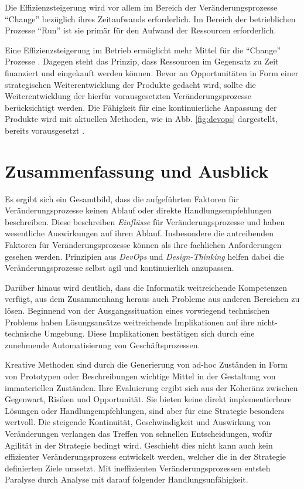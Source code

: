 \begin{enumerate}
    Die Effizienzsteigerung wird vor allem im Bereich der Veränderungsprozesse \enquote{Change} bezüglich ihres Zeitaufwands erforderlich. Im Bereich der betrieblichen Prozesse \enquote{Run} ist sie primär für den Aufwand der Ressourcen erforderlich.
    
    Eine Effizienzsteigerung im Betrieb ermöglicht mehr Mittel für die \enquote{Change} Prozesse \cite{Rausch2006}. Dagegen steht das Prinzip, dass Ressourcen im Gegensatz zu Zeit finanziert und eingekauft werden können. Bevor an Opportunitäten in Form einer strategischen Weiterentwicklung der Produkte \cite{Rausch2006} gedacht wird, sollte die Weiterentwicklung der hierfür vorausgesetzten Veränderungsprozesse berücksichtigt werden. Die Fähigkeit für eine kontinuierliche Anpassung \cite{Bussmann2006, Ganswindt2006} der Produkte wird mit aktuellen Methoden, wie in Abb. \ref{fig:devops} dargestellt, bereits vorausgesetzt \cite{Alt2017}.

\end{enumerate}

\section{Zusammenfassung und Ausblick}
Es ergibt sich ein Gesamtbild, dass die aufgeführten Faktoren für Veränderungsprozesse keinen Ablauf oder direkte Handlungsempfehlungen beschreiben. Diese beschreiben \emph{Einflüsse} für Veränderungsprozesse und haben wesentliche Auswirkungen auf ihren Ablauf. Insbesondere die antreibenden Faktoren für Veränderungsprozesse können als ihre fachlichen Anforderungen gesehen werden. Prinzipien aus \emph{DevOps} und \emph{Design-Thinking} helfen dabei die Veränderungsprozesse selbst agil und kontinuierlich anzupassen. 

Darüber hinaus wird deutlich, dass die Informatik weitreichende Kompetenzen verfügt, aus dem Zusammenhang heraus auch Probleme aus anderen Bereichen zu lösen. Beginnend von der Ausgangssituation eines vorwiegend technischen Problems haben Lösungsansätze weitreichende Implikationen auf ihre nicht-technische Umgebung. Diese Implikationen bestätigen sich durch eine zunehmende Automatisierung von Geschäftsprozessen.

Kreative Methoden sind durch die Generierung von ad-hoc Zuständen in Form von Prototypen oder Beschreibungen wichtige Mittel in der Gestaltung von immateriellen Zuständen. Ihre Evaluierung ergibt sich aus der Koheränz zwischen Gegenwart, Risiken und Opportunität. Sie bieten keine direkt implementierbare Lösungen oder Handlungempfehlungen, sind aber für eine Strategie besonders wertvoll. Die steigende Kontinuität, Geschwindigkeit und Auswirkung von Veränderungen verlangen das Treffen von schnellen Entscheidungen, wofür Agilität in der Strategie bedingt wird. Geschieht dies nicht kann auch kein effizienter Veränderungsprozess entwickelt werden, welcher die in der Strategie definierten Ziele umsetzt. Mit ineffizienten Veränderungsprozessen entsteh Paralyse durch Analyse mit darauf folgender Handlungsunfähigkeit. 

